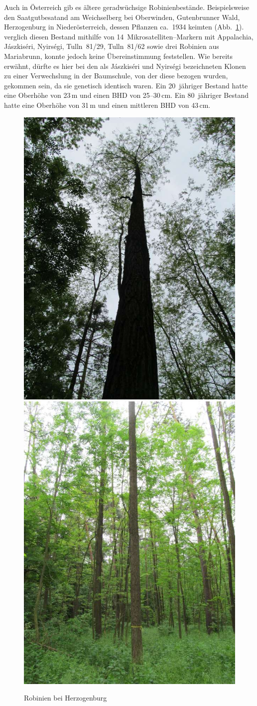 \documentclass[twocolumn]{scrartcl}
\begin{document}
Auch in Österreich gib es ältere geradwüchsige Robinienbestände.
Beispielsweise den Saatgutbesatand am Weichselberg bei
Oberwinden, Gutenbrunner Wald, Herzogenburg in Niederösterreich,
dessen Pflanzen ca.\ 1934 keimten (Abb.~\ref{fig:hezogenburg}).
\cite{heinze2014robinie} verglich diesen Bestand mithilfe von 14~Mikrosatelliten--Markern mit Appalachia, Jászkiséri, Nyirségi, Tulln~81/29, Tulln~81/62 sowie drei Robinien aus Mariabrunn, konnte jedoch keine Übereinstimmung feststellen.
Wie bereits erwähnt, dürfte es hier bei den als Jászkiséri und Nyirségi bezeichneten Klonen zu einer Verwechslung in der Baumschule, von der diese bezogen wurden, gekommen sein, da sie genetisch identisch waren.
Ein 20~jähriger Bestand hatte eine Oberhöhe von
23\,m und einen BHD von 25--30\,cm. Ein 80~jähriger Bestand hatte eine
Oberhöhe von 31\,m und einen mittleren BHD von 43\,cm.

\begin{figure}[htbp]
  \centering
  \includegraphics[width=.45\linewidth]{./bild/HerzogenburgRobinie2023a}
  \includegraphics[width=.45\linewidth]{./bild/HerzogenburgRobinie2023b}
  \caption{Robinien bei Herzogenburg}
  \label{fig:hezogenburg}
\end{figure}
\end{document}
